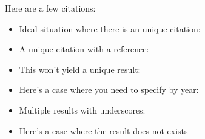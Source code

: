 \documentclass{article}
\begin{document}
Here are a few citations:
\begin{itemize}
    \item
        Ideal situation where there is an unique citation: \cite{mazur:eisenstein}
    \item
        A unique citation with a reference: \cite[Prop. 14.2]{mazur:eisenstein}
    \item
        This won't yield a unique result: \cite{mazur:modular}
    \item
        Here's a case where you need to specify by year:
        \cite{mazur:modular:2000}
    \item
        Multiple results with underscores:
        \cite{ribet:galois_real_multiplication}
    \item
        Here's a case where the result does not exists
        \cite{fermat:marvelous_proof}
\end{itemize}
    


\end{document}
